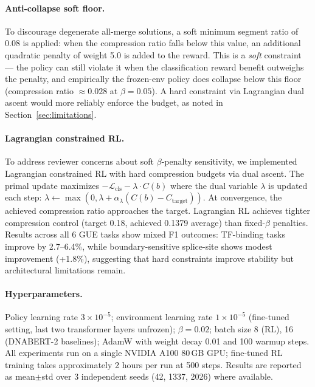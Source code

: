 \documentclass[sigconf,screen]{acmart}
\newcommand{\dnabert}{DNABERT-2\xspace}
\begin{document}
\paragraph{Anti-collapse soft floor.}
To discourage degenerate all-merge solutions, a soft minimum segment ratio of 0.08 is applied: when the compression ratio falls below this value, an additional quadratic penalty of weight 5.0 is added to the reward. This is a \emph{soft} constraint — the policy can still violate it when the classification reward benefit outweighs the penalty, and empirically the frozen-env policy does collapse below this floor (compression ratio $\approx 0.028$ at $\beta=0.05$). A hard constraint via Lagrangian dual ascent would more reliably enforce the budget, as noted in Section~\ref{sec:limitations}.

\paragraph{Lagrangian constrained RL.}
To address reviewer concerns about soft $\beta$-penalty sensitivity, we implemented Lagrangian constrained RL with hard compression budgets via dual ascent. The primal update maximizes $-\mathcal{L}_{\mathrm{cls}} - \lambda \cdot C(b)$ where the dual variable $\lambda$ is updated each step: $\lambda \leftarrow \max(0, \lambda + \alpha_\lambda (C(b) - C_{\mathrm{target}}))$. At convergence, the achieved compression ratio approaches the target. Lagrangian RL achieves tighter compression control (target 0.18, achieved 0.1379 average) than fixed-$\beta$ penalties. Results across all 6 GUE tasks show mixed F1 outcomes: TF-binding tasks improve by 2.7--6.4\%, while boundary-sensitive splice-site shows modest improvement (+1.8\%), suggesting that hard constraints improve stability but architectural limitations remain.

\paragraph{Hyperparameters.}
Policy learning rate $3\times10^{-5}$; environment learning rate $1\times10^{-5}$ (fine-tuned setting, last two transformer layers unfrozen); $\beta=0.02$; batch size 8 (RL), 16 (\dnabert baselines); AdamW \cite{loshchilov2019decoupled} with weight decay 0.01 and 100 warmup steps. All experiments run on a single NVIDIA A100 80\,GB GPU; fine-tuned RL training takes approximately 2 hours per run at 500 steps. Results are reported as mean$\pm$std over 3 independent seeds (42, 1337, 2026) where available.
\end{document}
